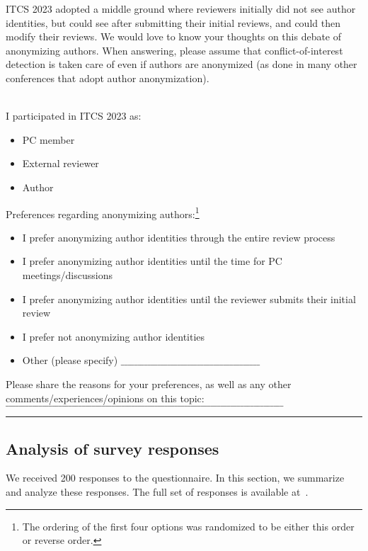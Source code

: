 \documentclass{article}
\newcommand{\rev}[1]{{\color{black}#1}}
\newcommand{\plosfootnote}[1]{\footnote{#1}}
\begin{document}
ITCS 2023 adopted a middle ground where reviewers initially did not see author identities, but could see after submitting their initial reviews, and could then modify their reviews. We would love to know your thoughts on this debate of anonymizing authors. When answering, please assume that conflict-of-interest detection is taken care of even if authors are anonymized (as done in many other conferences that adopt author anonymization).


~\\

\noindent I participated in ITCS 2023 as:
\begin{itemize}
 \renewcommand{\labelitemi}{$\square$}
    \item PC member
    \item External reviewer
    \item Author
\end{itemize}

\noindent Preferences regarding anonymizing authors:\plosfootnote{The ordering of the first four options was randomized to be either this order or reverse order.}
\begin{itemize}
 \renewcommand{\labelitemi}{$\square$}
    \item I prefer anonymizing author identities through the entire review process
    \item I prefer anonymizing author identities until the time for PC meetings/discussions
    \item I prefer anonymizing author identities until the reviewer submits their initial review
    \item I prefer not anonymizing author identities
    \item Other (please specify) $\_\_\_\_\_\_\_\_\_\_\_\_\_\_\_\_\_\_\_\_\_\_\_\_\_\_\_\_\_\_\_\_\_\_\_\_\_\_\_\_\_\_$
\end{itemize}

\noindent 
Please share the reasons for your preferences, as well as any other comments/experiences/opinions on this topic: $\_\_\_\_\_\_\_\_\_\_\_\_\_\_\_\_\_\_\_\_\_\_\_\_\_\_\_\_\_\_\_\_\_\_\_\_\_\_\_\_\_\_\_\_\_\_\_\_\_\_\_\_\_\_\_\_\_\_\_\_\_\_\_\_\_\_\_\_\_\_\_\_\_\_\_\_\_\_\_\_\_\_\_\_$

\noindent\rule{\textwidth}{1pt}


\subsection{Analysis of survey responses}
We received 200 responses to the questionnaire.  In this section, we summarize and analyze these responses. \rev{The full set of responses is available at~\cite[supporting information Data S1]{shah2022role}.}
\end{document}
